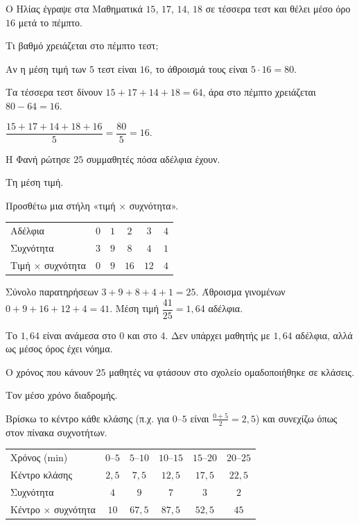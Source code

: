 \tixero Ο Ηλίας έγραψε στα Μαθηματικά $15$, $17$, $14$, $18$ σε τέσσερα τεστ και θέλει μέσο όρο $16$ μετά το πέμπτο.\par
\tithelo Τι βαθμό χρειάζεται στο πέμπτο τεστ;\par
\possindeo Αν η μέση τιμή των $5$ τεστ είναι $16$, το άθροισμά τους είναι $5\cdot16=80$.\par
\apantisi Τα τέσσερα τεστ δίνουν $15+17+14+18=64$, άρα στο πέμπτο χρειάζεται $80-64=16$.\par
\elegxos $\dfrac{15+17+14+18+16}{5}=\dfrac{80}{5}=16$.

\tixero Η Φανή ρώτησε $25$ συμμαθητές πόσα αδέλφια έχουν.\par
\tithelo Τη μέση τιμή.\par
\possindeo Προσθέτω μια στήλη «τιμή $\times$ συχνότητα».\par

\begin{center}
\renewcommand{\arraystretch}{1.25}
\begin{tabular}{lccccc}
\toprule
Αδέλφια & $0$ & $1$ & $2$ & $3$ & $4$\\
Συχνότητα & $3$ & $9$ & $8$ & $4$ & $1$\\
Τιμή $\times$ συχνότητα & $0$ & $9$ & $16$ & $12$ & $4$\\
\bottomrule
\end{tabular}
\end{center}

\apantisi Σύνολο παρατηρήσεων $3+9+8+4+1=25$. Άθροισμα γινομένων $0+9+16+12+4=41$. Μέση τιμή $\dfrac{41}{25}=1{,}64$ αδέλφια.\par
\elegxos Το $1{,}64$ είναι ανάμεσα στο $0$ και στο $4$. Δεν υπάρχει μαθητής με $1{,}64$ αδέλφια, αλλά ως μέσος όρος έχει νόημα.

\tixero Ο χρόνος που κάνουν $25$ μαθητές να φτάσουν στο σχολείο ομαδοποιήθηκε σε κλάσεις.\par
\tithelo Τον μέσο χρόνο διαδρομής.\par
\possindeo Βρίσκω το κέντρο κάθε κλάσης (π.χ. για $0$--$5$ είναι $\frac{0+5}{2}=2{,}5$) και συνεχίζω όπως στον πίνακα συχνοτήτων.\par

\begin{center}
\renewcommand{\arraystretch}{1.25}
\begin{tabular}{lccccc}
\toprule
Χρόνος (min) & $0$--$5$ & $5$--$10$ & $10$--$15$ & $15$--$20$ & $20$--$25$\\
Κέντρο κλάσης & $2{,}5$ & $7{,}5$ & $12{,}5$ & $17{,}5$ & $22{,}5$\\
Συχνότητα & $4$ & $9$ & $7$ & $3$ & $2$\\
Κέντρο $\times$ συχνότητα & $10$ & $67{,}5$ & $87{,}5$ & $52{,}5$ & $45$\\
\bottomrule
\end{tabular}
\end{center}

